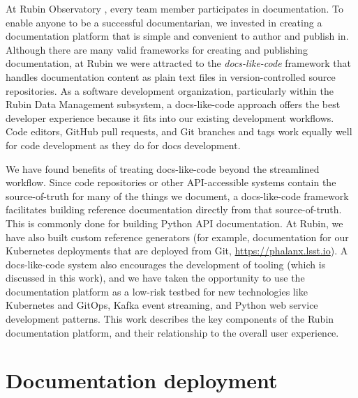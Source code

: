 \documentclass[11pt,twoside]{article}
\begin{document}

At Rubin Observatory \cite{2019ApJ...873..111I}, every team member participates in documentation.
To enable anyone to be a successful documentarian, we invested in creating a documentation platform that is simple and convenient to author and publish in.
Although there are many valid frameworks for creating and publishing documentation, at Rubin we were attracted to the \emph{docs-like-code} \citep{Gentle2022} framework that handles documentation content as plain text files in version-controlled source repositories.
As a software development organization, particularly within the Rubin Data Management subsystem, a docs-like-code approach offers the best developer experience because it fits into our existing development workflows.
Code editors, GitHub pull requests, and Git branches and tags work equally well for code development as they do for docs development.

We have found benefits of treating docs-like-code beyond the streamlined workflow.
Since code repositories or other API-accessible systems contain the source-of-truth for many of the things we document, a docs-like-code framework facilitates building reference documentation directly from that source-of-truth.
This is commonly done for building Python API documentation.
At Rubin, we have also built custom reference generators (for example, documentation for our Kubernetes deployments that are deployed from Git, \url{https://phalanx.lsst.io}).
A docs-like-code system also encourages the development of tooling (which is discussed in this work), and we have taken the opportunity to use the documentation platform as a low-risk testbed for new technologies like Kubernetes and GitOps, Kafka event streaming, and Python web service development patterns.
This work describes the key components of the Rubin documentation platform, and their relationship to the overall user experience.

\section{Documentation deployment}

\end{document}

